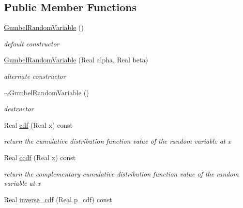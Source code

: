 \subsection*{Public Member Functions}
\begin{DoxyCompactItemize}
\item 
\hyperlink{classPecos_1_1GumbelRandomVariable_a9b8e5c169d13dc96f25437fd74e11169}{Gumbel\+Random\+Variable} ()\label{classPecos_1_1GumbelRandomVariable_a9b8e5c169d13dc96f25437fd74e11169}

\begin{DoxyCompactList}\small\item\em default constructor \end{DoxyCompactList}\item 
\hyperlink{classPecos_1_1GumbelRandomVariable_a84bef444db8b649965f459585aa5aa87}{Gumbel\+Random\+Variable} (Real alpha, Real beta)\label{classPecos_1_1GumbelRandomVariable_a84bef444db8b649965f459585aa5aa87}

\begin{DoxyCompactList}\small\item\em alternate constructor \end{DoxyCompactList}\item 
\hyperlink{classPecos_1_1GumbelRandomVariable_af50fc451a40c1d048f25c2d278945d4d}{$\sim$\+Gumbel\+Random\+Variable} ()\label{classPecos_1_1GumbelRandomVariable_af50fc451a40c1d048f25c2d278945d4d}

\begin{DoxyCompactList}\small\item\em destructor \end{DoxyCompactList}\item 
Real \hyperlink{classPecos_1_1GumbelRandomVariable_addd564e7f4f314e12d38df74d845f0d8}{cdf} (Real x) const \label{classPecos_1_1GumbelRandomVariable_addd564e7f4f314e12d38df74d845f0d8}

\begin{DoxyCompactList}\small\item\em return the cumulative distribution function value of the random variable at x \end{DoxyCompactList}\item 
Real \hyperlink{classPecos_1_1GumbelRandomVariable_a23c3b599e7e4788a9a5e9e93c3dbaf4d}{ccdf} (Real x) const \label{classPecos_1_1GumbelRandomVariable_a23c3b599e7e4788a9a5e9e93c3dbaf4d}

\begin{DoxyCompactList}\small\item\em return the complementary cumulative distribution function value of the random variable at x \end{DoxyCompactList}\item 
Real \hyperlink{classPecos_1_1GumbelRandomVariable_a918a1aac05ca349ea5313eebcba46c3e}{inverse\+\_\+cdf} (Real p\+\_\+cdf) const \label{classPecos_1_1GumbelRandomVariable_a918a1aac05ca349ea5313eebcba46c3e}


\end{DoxyCompactItemize}
